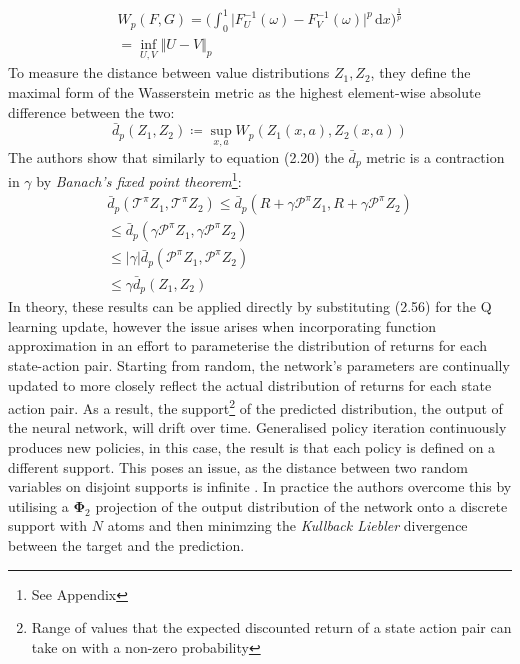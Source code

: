 \begin{equation}
    \begin{gathered}
        W_p(F,G) = \biggl ( \int_{0}^{1} \vert F^{-1}_U(\omega) - F^{-1}_{V}(\omega) \vert^p \,\mathrm{d}x \biggl )^{\frac{1}{p}} \\
        = \inf_{U,V} \Vert U - V \Vert_p
    \end{gathered}
\end{equation}
To measure the distance between value distributions $Z_1, Z_2$, they define the maximal form of the Wasserstein metric
as the highest element-wise absolute difference between the two:
\begin{equation}
    \bar{d}_p(Z_1, Z_2) \coloneqq \sup_{x,a} W_p(Z_1(x,a), Z_2(x,a)) 
\end{equation}
The authors show that similarly to equation (2.20) the $\bar{d}_p$ metric is a contraction in $\gamma$
by \emph{Banach's fixed point theorem}\footnote{See Appendix}:
\begin{equation}
    \begin{gathered}
        \bar{d}_p( \mathcal{T}^\pi Z_1, \mathcal{T}^\pi Z_2) \leqslant \bar{d}_p(R + \gamma \mathcal{P}^\pi Z_1, R + \gamma \mathcal{P}^\pi Z_2) \\
        \leqslant \bar{d}_p(\gamma \mathcal{P}^\pi Z_1, \gamma \mathcal{P}^\pi Z_2) \\
        \leqslant \vert \gamma \vert \bar{d}_p(\mathcal{P}^\pi Z_1, \mathcal{P}^\pi Z_2) \\
        \leqslant \gamma \bar{d}_p(Z_1, Z_2) 
    \end{gathered}
\end{equation}
In theory, these results can be applied directly by substituting (2.56) for the Q learning update, however
the issue arises when incorporating function approximation in an effort to parameterise the distribution
of returns for each state-action pair. Starting from random, the network's parameters 
are continually updated to more closely reflect the actual distribution of returns for each state action pair.
As a result, the support\footnote{Range of values that the expected discounted return of a state action pair can take on with a non-zero probability}
of the predicted distribution, the output of the neural network, will drift over time. Generalised policy iteration
continuously produces new policies, in this case, the result is that each policy is defined on a different support.
This poses an issue, as the distance between two random variables on disjoint supports is infinite \cite{Bellemare2017}.
In practice the authors overcome this by utilising a $\mathbf{\Phi}_2$ projection of the output distribution of the network 
onto a discrete support with $N$ atoms and then minimzing the \emph{Kullback Liebler} divergence between the target and the prediction.\\


